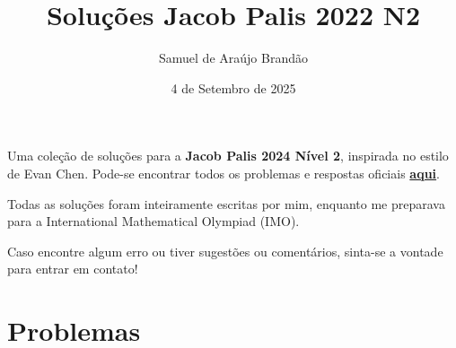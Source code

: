 \documentclass[12pt]{article}
\title{\sffamily\bfseries{Soluções Jacob Palis 2022 N2}}
\author{Samuel de Araújo Brandão}
\date{4 de Setembro de 2025}
\begin{document}
  \maketitle
  Uma coleção de soluções para a \textbf{Jacob Palis 2024 Nível 2}, inspirada no estilo de Evan Chen.
  Pode-se encontrar todos os problemas e respostas oficiais 
  \textbf{\href{https://www.obm.org.br/content/uploads/2024/06/jacob_palis_2024_provas_e_solucoes.pdf}{aqui}}.

  Todas as soluções foram inteiramente escritas por mim, enquanto me preparava para a
  International Mathematical Olympiad (IMO).

  Caso encontre algum erro ou tiver sugestões ou comentários, sinta-se a vontade 
  para entrar em contato!

  \tableofcontents

  \clearpage

  \section{\textsf{Problemas}}
\end{document}
